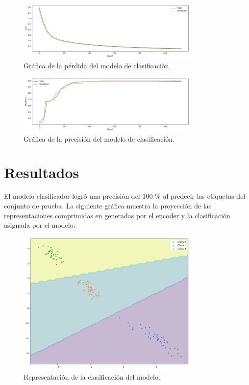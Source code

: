 \documentclass[paper=a4, fontsize=11pt]{scrartcl} %
\numberwithin{equation}{section} %
\numberwithin{figure}{section} %
\numberwithin{table}{section} %
\begin{document}
\begin{figure}[H]
\centering
\includegraphics[width=0.8\textwidth]{images/accuracy_loss_frozenencoder.png}
\caption{Gráfica de la pérdida del modelo de clasificación.}
\end{figure}
\begin{figure}[H]
\centering
\includegraphics[width=0.8\textwidth]{images/accuracy_frozenencoder.png}
\caption{Gráfica de la precisión del modelo de clasificación.}
\end{figure}

\section{Resultados}

El modelo clasificador logró una precisión del 100 \% al predecir las etiquetas del conjunto de prueba. La siguiente gráfica muestra la proyección de las representaciones comprimidas en generadas por el encoder y la clasificación asignada por el modelo:

\begin{figure}[H]
\centering
\includegraphics[width=0.8\textwidth]{images/decision_boundaries.png}
\caption{Representación de la clasificación del modelo.}
\end{figure}
\end{document}
